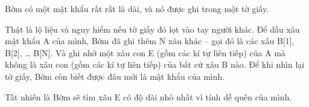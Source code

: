 Bờm có một mật khẩu rất rất là dài, và nó được ghi trong một tờ giấy.  

   Thật là lộ liệu và nguy hiểm nếu tờ giấy đó lọt vào tay người khác. Để dấu xâu mật khẩu A của mình, Bờm đã ghi thêm N xâu khác – gọi đó là các xâu B[1], B[2], … B[N]. Và ghi nhớ một xâu con E (gồm các kí tự liên tiếp) của A mà không là xâu con (gồm các kí tự liên tiếp) của bất cứ xâu B nào. Để khi nhìn lại tờ giấy, Bờm còn biết được đâu mới là mật khẩu của mình.  

   Tất nhiên là Bờm sẽ tìm xâu E có độ dài nhỏ nhất vì tính dễ quên của mình.